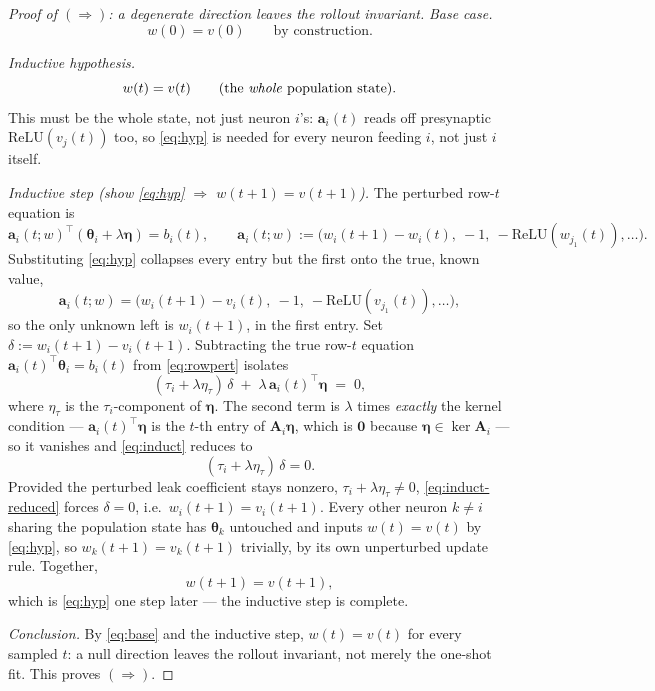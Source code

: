 \documentclass[11pt]{article}
\newcommand{\Mat}[1]{\mathbf{#1}}
\newcommand{\A}{\Mat{A}}
\newcommand{\thet}{\boldsymbol{\theta}}
\begin{document}
\begin{proof}[Proof of $(\Rightarrow)$: a degenerate direction leaves the rollout invariant]

\emph{Base case.}
\begin{equation}
w(0) = v(0) \qquad \text{by construction.}
\label{eq:base}
\end{equation}

\emph{Inductive hypothesis.}
\begin{equation}
w(t) = v(t) \qquad \text{(the \emph{whole} population state).}
\label{eq:hyp}
\end{equation}
This must be the whole state, not just neuron $i$'s: $\Mat a_i(t)$ reads off
presynaptic $\mathrm{ReLU}(v_j(t))$ too, so \eqref{eq:hyp} is needed for every
neuron feeding $i$, not just $i$ itself.

\emph{Inductive step (show \eqref{eq:hyp} $\Rightarrow$ $w(t{+}1)=v(t{+}1)$).}
The perturbed row-$t$ equation is
\begin{equation}
\Mat a_i(t;w)^{\!\top}(\thet_i+\lambda\boldsymbol\eta) = b_i(t), \qquad
\Mat a_i(t;w) := \big(w_i(t{+}1)-w_i(t),\ -1,\ -\mathrm{ReLU}(w_{j_1}(t)),\dots\big) .
\label{eq:rowpert}
\end{equation}
Substituting \eqref{eq:hyp} collapses every entry but the first onto the true,
known value,
\begin{equation}
\Mat a_i(t;w) = \big(w_i(t{+}1)-v_i(t),\ -1,\ -\mathrm{ReLU}(v_{j_1}(t)),\dots\big) ,
\end{equation}
so the only unknown left is $w_i(t+1)$, in the first entry. Set
$\delta := w_i(t+1)-v_i(t+1)$. Subtracting the true row-$t$ equation
$\Mat a_i(t)^{\!\top}\thet_i=b_i(t)$ from \eqref{eq:rowpert} isolates
\begin{equation}
(\tau_i+\lambda\eta_\tau)\,\delta \;+\; \lambda\,\Mat a_i(t)^{\!\top}\boldsymbol\eta \;=\; 0 ,
\label{eq:induct}
\end{equation}
where $\eta_\tau$ is the $\tau_i$-component of $\boldsymbol\eta$. The second
term is $\lambda$ times \emph{exactly} the kernel condition --- $\Mat
a_i(t)^{\!\top}\boldsymbol\eta$ is the $t$-th entry of $\A_i\boldsymbol\eta$,
which is $\Mat 0$ because $\boldsymbol\eta\in\ker\A_i$ --- so it vanishes and
\eqref{eq:induct} reduces to
\begin{equation}
(\tau_i+\lambda\eta_\tau)\,\delta=0 .
\label{eq:induct-reduced}
\end{equation}
Provided the perturbed leak coefficient stays nonzero,
$\tau_i+\lambda\eta_\tau\neq 0$, \eqref{eq:induct-reduced} forces $\delta=0$,
i.e.\ $w_i(t+1)=v_i(t+1)$. Every other neuron $k\neq i$ sharing the population
state has $\thet_k$ untouched and inputs $w(t)=v(t)$ by \eqref{eq:hyp}, so
$w_k(t+1)=v_k(t+1)$ trivially, by its own unperturbed update rule. Together,
\begin{equation}
w(t+1) = v(t+1) ,
\end{equation}
which is \eqref{eq:hyp} one step later --- the inductive step is complete.

\emph{Conclusion.} By \eqref{eq:base} and the inductive step, $w(t)=v(t)$ for
every sampled $t$: a null direction leaves the rollout invariant, not merely
the one-shot fit. This proves $(\Rightarrow)$.
\end{proof}
\end{document}

